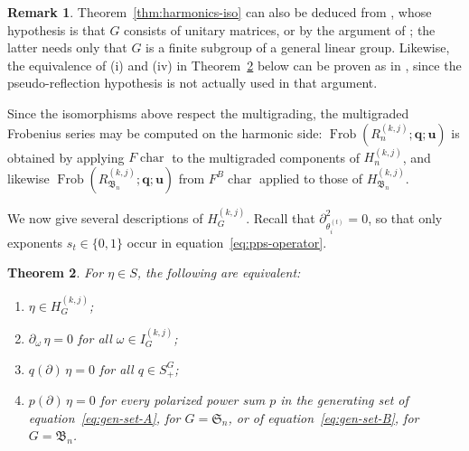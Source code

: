 \documentclass[12pt]{amsart}
\theoremstyle{plain}
\newtheorem{theorem}{Theorem}[section]
\theoremstyle{definition}
\newtheorem{remark}[theorem]{Remark}
\DeclareMathOperator{\Frob}{Frob}
\DeclareMathOperator{\ch}{char}
\begin{document}
\begin{remark}\label{rem:harmonics-lit}
    Theorem~\ref{thm:harmonics-iso} can also be deduced from \cite[Proposition 5.7]{SwansonPreprint}, whose hypothesis is that $G$ consists of unitary matrices, or by the argument of \cite[Lemma 5.4, equations (36), (37)]{SwansonWallach1}; the latter needs only that $G$ is a finite subgroup of a general linear group. 
    Likewise, the equivalence of (i) and (iv) in Theorem~\ref{thm:harmonics-pde} below can be proven as in \cite[Lemma 5.4, equation (35)]{SwansonWallach1}, since the pseudo-reflection hypothesis is not actually used in that argument.
\end{remark}

Since the isomorphisms above respect the multigrading, the multigraded Frobenius series may be computed on the harmonic side: $\Frob(R_n^{(k,j)}; \mathbf{q}; \mathbf{u})$ is obtained by applying $F\ch$ to the multigraded components of $H_n^{(k,j)}$, and likewise $\Frob(R_{\mathfrak{B}_n}^{(k,j)}; \mathbf{q}; \mathbf{u})$ from $F^{B}\ch$ applied to those of $H_{\mathfrak{B}_n}^{(k,j)}$.

We now give several descriptions of $H_G^{(k,j)}$.
Recall that $\partial_{\theta_i^{(t)}}^2 = 0$, so that only exponents $s_t \in \{0,1\}$ occur in equation~\eqref{eq:pps-operator}.

\begin{theorem}\label{thm:harmonics-pde}
For $\eta \in S$, the following are equivalent:
\begin{enumerate}
\renewcommand{\labelenumi}{(\roman{enumi})}
    \item $\eta \in H_G^{(k,j)}$;
    \item $\partial_\omega\, \eta = 0$ for all $\omega \in I_G^{(k,j)}$;
    \item $q(\partial)\, \eta = 0$ for all $q \in S_+^{G}$;
    \item $p(\partial)\, \eta = 0$ for every polarized power sum $p$ in the generating set of equation~\eqref{eq:gen-set-A}, for $G = \mathfrak{S}_n$, or of equation~\eqref{eq:gen-set-B}, for $G = \mathfrak{B}_n$.
\end{enumerate}
\end{theorem}
\end{document}
